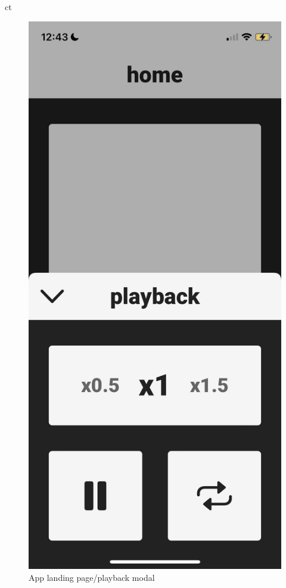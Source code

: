 ct\documentclass[a4paper,11pt]{article}
\begin{document}
\begin{figure}[H]
\includegraphics[scale=0.2]{img/app/playback.png}
\caption{App landing page/playback modal}
\label{fig:app_screenshots}
\end{figure}
\newpage
\end{document}
